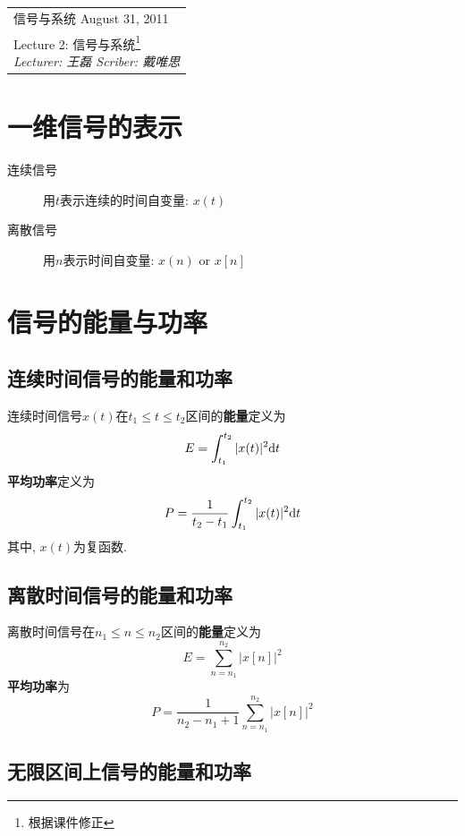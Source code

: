 \def\lecture{2}
\clearpage \noindent\begin{tabularx}{\linewidth}{|X|}
\hline \vskip -2mm
{\sf 信号与系统} \hfill August 31, 2011 \\
{\centering \sf \large Lecture \lecture:
信号与系统\footnote{根据课件修正} \\ }
\textit{Lecturer: 王磊 \hfill Scriber: 戴唯思}\\ \hline
\end{tabularx}
\setcounter{section}{0}
\renewcommand{\thepage}{\lecture -\arabic{page}}


\section{一维信号的表示}

    \begin{description}
        \item[连续信号] 用$t$表示连续的时间自变量: $x(t)$
        \item[离散信号] 用$n$表示时间自变量: $x(n)$ or $x[n]$
    \end{description}

\section{信号的能量与功率}

    \subsection{连续时间信号的能量和功率}

    连续时间信号$x(t)$在$t_1\leqslant t\leqslant t_2$区间的\textbf{能量}定义为
    \[ E=\int_{t_1}^{t_2}|{x(t)}|^2\mathrm{d} t \]
    \textbf{平均功率}定义为
    \[ P=\frac{1}{t_2-t_1}\int_{t_1}^{t_2}|x(t)|^2\mathrm{d} t \]
    其中, $x(t)$为复函数.

    \subsection{离散时间信号的能量和功率}

    离散时间信号在$n_1\leqslant n\leqslant n_2$区间的\textbf{能量}定义为
    \[ E=\sum_{n=n_1}^{n_2}|x[n]|^2 \]
    \textbf{平均功率}为
    \[ P=\frac{1}{n_2-n_1+1}\sum_{n=n_1}^{n_2}|x[n]|^2 \]

    \subsection{无限区间上信号的能量和功率}

